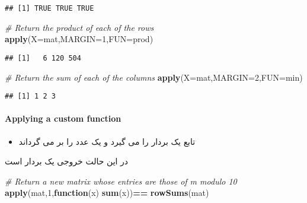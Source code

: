 \documentclass[
]{article}
\newenvironment{Shaded}{\begin{snugshade}}{\end{snugshade}}
\newcommand{\AttributeTok}[1]{\textcolor[rgb]{0.13,0.29,0.53}{#1}}
\newcommand{\CommentTok}[1]{\textcolor[rgb]{0.56,0.35,0.01}{\textit{#1}}}
\newcommand{\ControlFlowTok}[1]{\textcolor[rgb]{0.13,0.29,0.53}{\textbf{#1}}}
\newcommand{\DecValTok}[1]{\textcolor[rgb]{0.00,0.00,0.81}{#1}}
\newcommand{\FunctionTok}[1]{\textcolor[rgb]{0.13,0.29,0.53}{\textbf{#1}}}
\newcommand{\NormalTok}[1]{#1}
\newcommand{\SpecialCharTok}[1]{\textcolor[rgb]{0.81,0.36,0.00}{\textbf{#1}}}
\providecommand{\tightlist}{%
  \setlength{\itemsep}{0pt}\setlength{\parskip}{0pt}}
\begin{document}
\begin{verbatim}
## [1] TRUE TRUE TRUE
\end{verbatim}

\begin{Shaded}
\begin{Highlighting}[]
\CommentTok{\# Return the product of each of the rows}
\FunctionTok{apply}\NormalTok{(}\AttributeTok{X=}\NormalTok{mat,}\AttributeTok{MARGIN=}\DecValTok{1}\NormalTok{,}\AttributeTok{FUN=}\NormalTok{prod)}
\end{Highlighting}
\end{Shaded}

\begin{verbatim}
## [1]   6 120 504
\end{verbatim}

\begin{Shaded}
\begin{Highlighting}[]
\CommentTok{\# Return the sum of each of the columns}
\FunctionTok{apply}\NormalTok{(}\AttributeTok{X=}\NormalTok{mat,}\AttributeTok{MARGIN=}\DecValTok{2}\NormalTok{,}\AttributeTok{FUN=}\NormalTok{min)}
\end{Highlighting}
\end{Shaded}

\begin{verbatim}
## [1] 1 2 3
\end{verbatim}

\hypertarget{applying-a-custom-function}{%
\paragraph{Applying a custom
function}\label{applying-a-custom-function}}

\begin{itemize}
\tightlist
\item
  تابع یک بردار را می گیرد و یک عدد را بر می گرداند
\end{itemize}

در این حالت خروجی یک بردار است

\begin{Shaded}
\begin{Highlighting}[]
\CommentTok{\# Return a new matrix whose entries are those of \textquotesingle{}m\textquotesingle{} modulo 10}
\FunctionTok{apply}\NormalTok{(mat,}\DecValTok{1}\NormalTok{,}\ControlFlowTok{function}\NormalTok{(x) }\FunctionTok{sum}\NormalTok{(x))}\SpecialCharTok{==} \FunctionTok{rowSums}\NormalTok{(mat)}
\end{Highlighting}
\end{Shaded}
\end{document}
